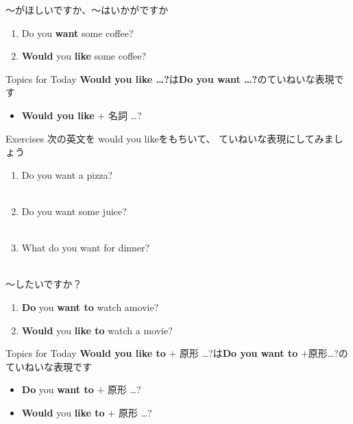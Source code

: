 \documentclass[aspectratio=169,xcolor={dvipsnames,table}]{beamer}
\begin{document}
\begin{frame}[plain]{～がほしいですか、～はいかがですか}
\large
 \begin{enumerate}
  \item Do you \textbf{want} some coffee?
  \item \textbf{Would} you \textbf{like} some coffee? 
 \end{enumerate}

\begin{block}{Topics for Today}\small
\textbf{Would you like \ldots ?}は\textbf{Do you want \ldots ?}のていねいな表現です
\begin{itemize}[square]\small
 \item \textbf{Would you like} $+$ 名詞 \ldots ?
       \end{itemize}
\end{block}
\hfill{\scriptsize {}}

\end{frame}
\begin{frame}[plain]{Exercises}
次の英文を would you likeをもちいて、 ていねいな表現にしてみましょう
 \begin{enumerate}
  \item Do you want a pizza?\\
\\
  \item Do you want some juice?\\
\\
  \item What do you want for dinner?\\
\\
 \end{enumerate}

\hfill{\scriptsize {}}

\end{frame}
\begin{frame}[plain]{～したいですか？}
\large
 \begin{enumerate}
  \item \textbf{Do} you \textbf{want to} watch amovie?
  \item \textbf{Would} you \textbf{like to} watch a movie?
 \end{enumerate}

\begin{block}{Topics for Today}\small
\textbf{Would you like to} $+$ 原形 \ldots ?は\textbf{Do you want to} $+$原形\ldots ?のていねいな表現です
\begin{itemize}[square]\small
 \item \textbf{Do} you \textbf{want to} $+$ 原形 \ldots ?
 \item \textbf{Would} you \textbf{like to} $+$ 原形 \ldots ?
       \end{itemize}
\end{block}
\hfill{\scriptsize {}}

\end{frame}
\end{document}
